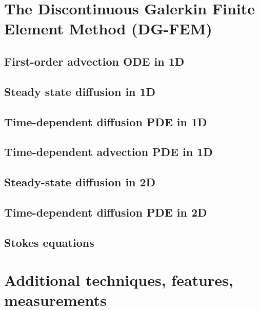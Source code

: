 \documentclass[a4paper]{article}
\numberwithin{equation}{section}
\begin{document}
\newpage
\section{The Discontinuous Galerkin Finite Element Method (DG-FEM) \label{dgfem}} %



\subsection{First-order advection ODE in 1D} 
\subsection{Steady state diffusion in 1D \label{ss:dgss1D}} 
\subsection{Time-dependent diffusion PDE in 1D} 

\newpage
\subsection{Time-dependent advection PDE in 1D \label{ss:dgfem1D_adv}}  %

\newpage
\subsection{Steady-state diffusion in 2D} 
\subsection{Time-dependent diffusion PDE in 2D}

\newpage
\subsection{Stokes equations} 



\newpage
\section{Additional techniques, features, measurements} %
\end{document}
